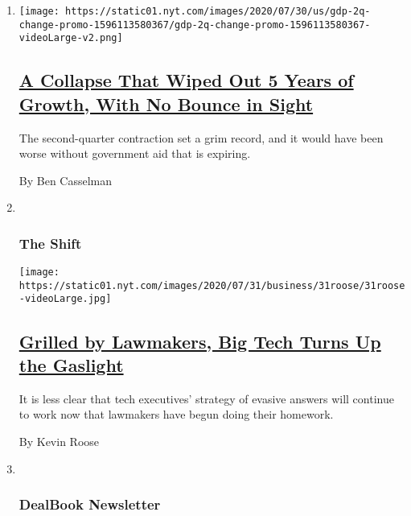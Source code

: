 \begin{enumerate}
\def\labelenumi{\arabic{enumi}.}
\item
  \texttt{[image: https://static01.nyt.com/images/2020/07/30/us/gdp-2q-change-promo-1596113580367/gdp-2q-change-promo-1596113580367-videoLarge-v2.png]}

  \hypertarget{a-collapse-that-wiped-out-5-years-of-growth-with-no-bounce-in-sight}{%
  \subsection{\texorpdfstring{\href{/2020/07/30/business/economy/q2-gdp-coronavirus-economy.html}{A
  Collapse That Wiped Out 5 Years of Growth, With No Bounce in
  Sight}}{A Collapse That Wiped Out 5 Years of Growth, With No Bounce in Sight}}\label{a-collapse-that-wiped-out-5-years-of-growth-with-no-bounce-in-sight}}

  The second-quarter contraction set a grim record, and it would have
  been worse without government aid that is expiring.

  By Ben Casselman
\item ~
  \hypertarget{the-shift}{%
  \subsubsection{The Shift}\label{the-shift}}

  \texttt{[image: https://static01.nyt.com/images/2020/07/31/business/31roose/31roose-videoLarge.jpg]}

  \hypertarget{grilled-by-lawmakers-big-tech-turns-up-the-gaslight}{%
  \subsection{\texorpdfstring{\href{/2020/07/30/technology/big-tech-ceos.html}{Grilled
  by Lawmakers, Big Tech Turns Up the
  Gaslight}}{Grilled by Lawmakers, Big Tech Turns Up the Gaslight}}\label{grilled-by-lawmakers-big-tech-turns-up-the-gaslight}}

  It is less clear that tech executives' strategy of evasive answers
  will continue to work now that lawmakers have begun doing their
  homework.

  By Kevin Roose
\item ~
  \hypertarget{dealbook-newsletter-1}{%
  \subsubsection{DealBook Newsletter}\label{dealbook-newsletter-1}}


\end{enumerate}
